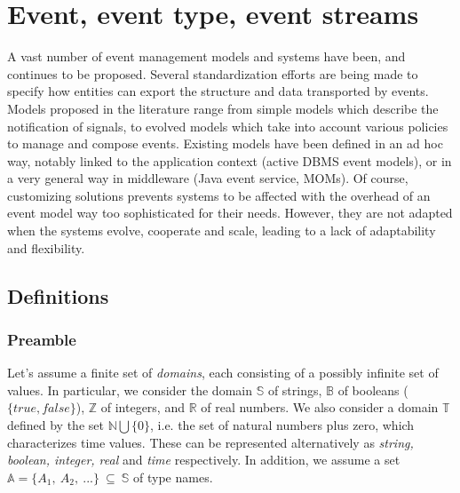 \section{Event, event type, event streams}
\label{ch3:sec2}
A vast number of event management models and systems have been, and continues to be proposed. Several standardization efforts are being made to specify how entities can export the structure and data transported by events. Models proposed in the literature range from simple models which describe the notification of signals, to evolved models which take into account various policies to manage and compose events. 
Existing models have been defined in an ad hoc way, notably linked to the application context (active DBMS event models), or in a very general way in middleware (Java event service, MOMs). Of course, customizing solutions prevents systems to be affected with the overhead of an event model way too sophisticated for their needs. However, they are not adapted when the systems evolve, cooperate and scale, leading to a lack of adaptability and flexibility. 
 \subsection{Definitions}
 \subsubsection{Preamble}
Let's assume a finite set of \textit{domains}, each consisting of a possibly infinite set of values. In particular, we consider the domain $\mathbb{S}$ of strings, $\mathbb{B}$ of booleans ($\{true, false\}$), $\mathbb{Z}$ of integers, and $\mathbb{R}$ of real numbers. We also consider a domain $\mathbb{T}$ defined by the set $\mathbb{N} \bigcup \{0\}$, i.e. the set of natural numbers plus zero, which characterizes time values. These can be represented alternatively as \textit{string, boolean, integer, real} and \textit{time} respectively. In addition, we assume a set   $\mathbb{A} = \{A_1,\ A_2,\ ...\}\ \subseteq\ \mathbb{S}$ of type names. 
